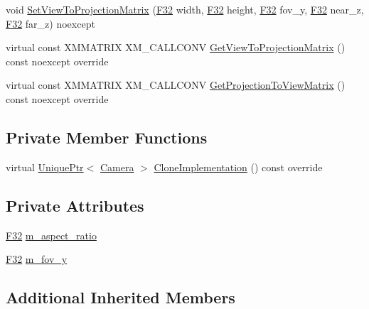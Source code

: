 \begin{DoxyCompactItemize}
\item 
void \hyperlink{classmage_1_1_perspective_camera_af118d8e1dd3fffa79a20b6201fb7cb9d}{Set\+View\+To\+Projection\+Matrix} (\hyperlink{namespacemage_aa97e833b45f06d60a0a9c4fc22ae02c0}{F32} width, \hyperlink{namespacemage_aa97e833b45f06d60a0a9c4fc22ae02c0}{F32} height, \hyperlink{namespacemage_aa97e833b45f06d60a0a9c4fc22ae02c0}{F32} fov\+\_\+y, \hyperlink{namespacemage_aa97e833b45f06d60a0a9c4fc22ae02c0}{F32} near\+\_\+z, \hyperlink{namespacemage_aa97e833b45f06d60a0a9c4fc22ae02c0}{F32} far\+\_\+z) noexcept
\item 
virtual const X\+M\+M\+A\+T\+R\+IX X\+M\+\_\+\+C\+A\+L\+L\+C\+O\+NV \hyperlink{classmage_1_1_perspective_camera_a10348ff23fab164566ffb223a75bf745}{Get\+View\+To\+Projection\+Matrix} () const noexcept override
\item 
virtual const X\+M\+M\+A\+T\+R\+IX X\+M\+\_\+\+C\+A\+L\+L\+C\+O\+NV \hyperlink{classmage_1_1_perspective_camera_ac0353864cc0eafe5ea6af54b2b860992}{Get\+Projection\+To\+View\+Matrix} () const noexcept override
\end{DoxyCompactItemize}
\subsection*{Private Member Functions}
\begin{DoxyCompactItemize}
\item 
virtual \hyperlink{namespacemage_a3316d7143a973e37adf1110f2e80ca31}{Unique\+Ptr}$<$ \hyperlink{classmage_1_1_camera}{Camera} $>$ \hyperlink{classmage_1_1_perspective_camera_aa597ab884256b7e6fad63653af3ac789}{Clone\+Implementation} () const override
\end{DoxyCompactItemize}
\subsection*{Private Attributes}
\begin{DoxyCompactItemize}
\item 
\hyperlink{namespacemage_aa97e833b45f06d60a0a9c4fc22ae02c0}{F32} \hyperlink{classmage_1_1_perspective_camera_a9fd1ed697013ed616a616e32dcd009ca}{m\+\_\+aspect\+\_\+ratio}
\item 
\hyperlink{namespacemage_aa97e833b45f06d60a0a9c4fc22ae02c0}{F32} \hyperlink{classmage_1_1_perspective_camera_aa55ec2c2f069dcdd8bfd0554a2f5011d}{m\+\_\+fov\+\_\+y}
\end{DoxyCompactItemize}
\subsection*{Additional Inherited Members}


